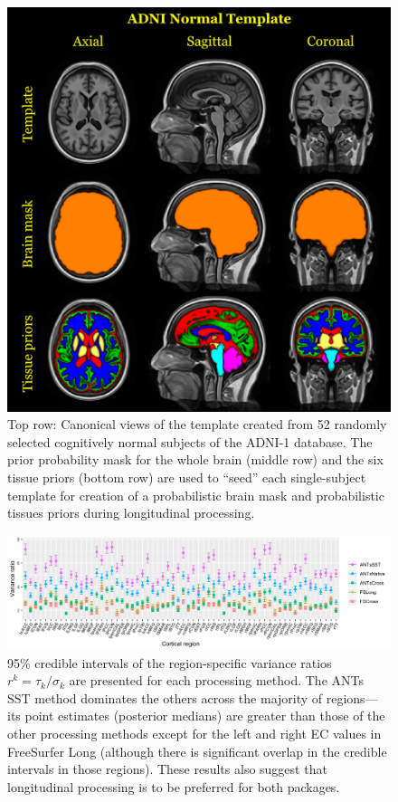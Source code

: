 \documentclass[]{article}
\begin{document}
\begin{figure}
\centering
\includegraphics[width=\textwidth]{Figure4.pdf}
\caption{Top row:  Canonical views of the template created from 52 randomly selected
cognitively normal subjects
of the ADNI-1 database.  The prior probability mask for the whole brain (middle row)
and the six tissue priors (bottom row) are used to ``seed'' each single-subject template for creation of
a probabilistic brain mask and probabilistic tissues priors during longitudinal
processing.}
\label{fig:template}
\end{figure}

\newpage

\begin{figure}[ht!]
\centering
\includegraphics[width=\textwidth]{Figure6.pdf}
\caption{95\% credible intervals of the region-specific variance ratios
$r^k=\tau_k/\sigma_k$ are presented for each processing method.  The ANTs
SST method dominates the others across the majority of
regions---its point estimates (posterior medians) are greater than those of the other
processing methods except for the left and right EC values in
FreeSurfer Long (although there is significant overlap in the credible intervals
in those regions).
These results also suggest that longitudinal processing is to be
preferred for both packages.}
\label{fig:ratios}
\end{figure}
\end{document}
